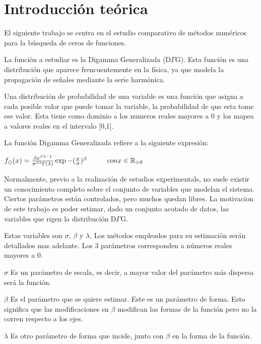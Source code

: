 \section{Introducci\'on te\'orica}

El siguiente trabajo se centra en el estudio comparativo de m\'etodos
num\'ericos para la b\'usqueda de ceros de funciones. 

La funci\'on a estudiar es la Digamma Generalizada (D$\Gamma$G). 
Esta funci\'on es una distribuci\'on que aparece frencuentemente en la f\'isica,
ya que modela la propagaci\'on de se\~nales mediante la serie harm\'onica.

Una distribuci\'on de probabilidad de una variable es una funci\'on que asigna
a cada posible valor que puede tomar la variable, la probabilidad de que esta
tome ese valor. Esta tiene como dominio a los numeros reales mayores a
0 y los mapea a valores reales en el intervalo [0,1].

La funci\'on Digamma Generalizada refiere a la siguiente expresi\'on:

\begin{center}
\begin{math}
f_{\ominus}(x) = \frac{\beta x^{\beta \lambda -1}}{\sigma ^{\beta \lambda}
\Gamma(\lambda)}\exp {-(\frac{x}{\sigma})^{\beta}} \hspace{10 mm} con x \in \mathbb{R}_{>0}
\end{math}
\end{center}

Normalmente, previo a la realizaci\'on de estudios experimentals, no suele
existir un conocimiento completo sobre el conjunto de variables que modelan
el sistema. Ciertos par\'ametros est\'an controlados, pero muchos quedan libres. 
La motivacion de este trabajo es poder estimar, dado un conjunto acotado de datos, 
las variables que rigen la distribuci\'on D$\Gamma$G. 

Estas variables son $\sigma$, $\beta$ y $\lambda$. Los m\'etodos empleados para 
su estimaci\'on ser\'an detallados mas adelante. Los 3 par\'ametros corresponden
a n\'umeros reales mayores a 0.

\begin{itemize}
  \begin{item} $\sigma$ Es un par\'ametro de escala, es decir, a mayor valor del
par\'ametro m\'as dispersa ser\'a la funci\'on.\end{item}
  \begin{item} $\beta$ Es el par\'ametro que se quiere estimar. Este es un
par\'ametro de forma. Esto significa que las modificaciones en $\beta$ modifican
las formas de la funci\'on pero no la corren respecto a los ejes. \end{item}
  \begin{item} $\lambda$ Es otro par\'ametro de forma que incide, junto con
$\beta$ en la forma de la funci\'on.\end{item}
\end{itemize}

